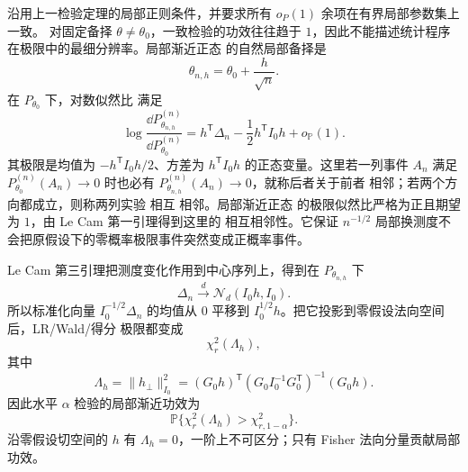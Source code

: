 \begin{proposition}[局部备择的非中心卡方与功效]
沿用上一检验定理的局部正则条件，并要求所有 $o_P(1)$ 余项在有界局部参数集上一致。
对固定备择 $\theta\ne\theta_0$，一致检验的功效往往趋于 $1$，因此不能描述统计程序在极限中的最细分辨率。局部渐近正态 的自然局部备择是
\[
 \theta_{n,h}
 =\theta_0+\frac h{\sqrt n}.
\]
在 $P_{\theta_0}$ 下，对数似然比 满足
\[
 \log\frac{\dd P_{\theta_{n,h}}^{(n)}}
 {\dd P_{\theta_0}^{(n)}}
 =h^{\mathsf T}\Delta_n
 -\frac12h^{\mathsf T}I_0h
 +o_{\mathbb P}(1).
\]
其极限是均值为 $-h^{\mathsf T}I_0h/2$、方差为 $h^{\mathsf T}I_0h$ 的正态变量。这里若一列事件 $A_n$ 满足 $P_{\theta_0}^{(n)}(A_n)\to0$ 时也必有 $P_{\theta_{n,h}}^{(n)}(A_n)\to0$，就称后者关于前者 相邻；若两个方向都成立，则称两列实验 相互 相邻。局部渐近正态 的极限似然比严格为正且期望为 $1$，由 Le Cam 第一引理得到这里的 相互相邻性。它保证 $n^{-1/2}$ 局部换测度不会把原假设下的零概率极限事件突然变成正概率事件。

Le Cam 第三引理把测度变化作用到中心序列上，得到在 $P_{\theta_{n,h}}$ 下
\begin{equation}\label{eq:math-stat-third-lemma-shift}
 \Delta_n
 \xrightarrow{d}\mathcal N_d(I_0h,I_0).
\end{equation}
所以标准化向量 $I_0^{-1/2}\Delta_n$ 的均值从 $0$ 平移到 $I_0^{1/2}h$。把它投影到零假设法向空间后，LR/Wald/得分 极限都变成
\[
 \chi^2_r(\Lambda_h),
\]
其中
\begin{equation*}\Lambda_h
 =\|h_\perp\|_{I_0}^2
 =(G_0h)^{\mathsf T}
 (G_0I_0^{-1}G_0^{\mathsf T})^{-1}
 (G_0h).
\end{equation*}
因此水平 $\alpha$ 检验的局部渐近功效为
\[
 \mathbb P\{\chi^2_r(\Lambda_h)>\chi^2_{r,1-\alpha}\}.
\]
沿零假设切空间的 $h$ 有 $\Lambda_h=0$，一阶上不可区分；只有 Fisher 法向分量贡献局部功效。
\end{proposition}

